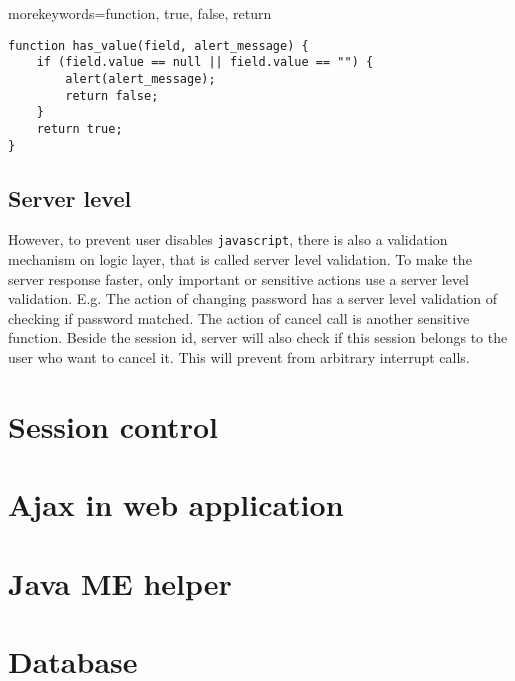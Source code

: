 {morekeywords={function, true, false, return}}
\lstset{language=Java}

\begin{lstlisting}[frame=lines, float, caption=JavaScript validation code, label=JavaScriptValidationCode]
function has_value(field, alert_message) {
    if (field.value == null || field.value == "") {
        alert(alert_message);
        return false;
    }
    return true;
}
\end{lstlisting}

\subsection{Server level}
\label{sec:WebApplication:ValidationMechanism:ServerLevel}

However, to prevent user disables \texttt{javascript}, there is also a validation mechanism on logic layer, that is called server level validation. To make the server response faster, only important or sensitive actions use a server level validation. E.g. The action of changing password has a server level validation of checking if password matched. The action of cancel call is another sensitive function. Beside the session id, server will also check if this session belongs to the user who want to cancel it. This will prevent from arbitrary interrupt calls.

\section{Session control}
\label{sec:WebApplication:SessionControl}

\section{Ajax in web application}
\label{sec:WebApplication:AjaxInWebApplication}

\section{Java ME helper}
\label{sec:WebApplication:JavaMEHelper}

\section{Database}
\label{sec:WebApplication:Database}

